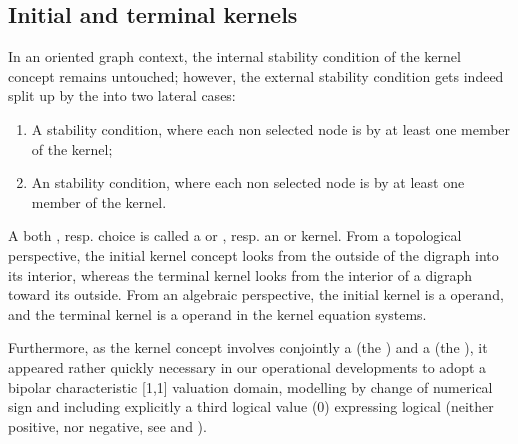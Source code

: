 \documentclass[a4paper,12pt,english]{sphinxhowto}
\begin{document}
\subsection{Initial and terminal kernels}
\label{\detokenize{tutorial:initial-and-terminal-kernels}}
In an oriented graph context, the internal stability condition of the kernel concept remains untouched; however, the external stability condition gets indeed split up by the  into two lateral cases:
\begin{enumerate}
%
\item {} 
A  stability condition, where each non selected node is  by at least one member of the kernel;

\item {} 
An  stability condition, where each non selected node is  by at least one member of the kernel.

\end{enumerate}

A both   , resp.  choice is called a  or , resp. an  or  kernel. From a topological perspective, the initial kernel concept looks from the outside of the digraph into its interior, whereas the terminal kernel looks from the interior of a digraph toward its outside. From an algebraic perspective, the initial kernel is a  operand, and the terminal kernel is a  operand in the  kernel equation systems.

Furthermore, as the kernel concept involves conjointly a  (the ) and a  (the ), it appeared rather quickly necessary in our operational developments to adopt a bipolar characteristic {[}\sphinxhyphen{}1,1{]} valuation domain, modelling  by change of numerical sign and including explicitly a third  logical value (0) expressing logical  (neither positive, nor negative, see  and ).
\end{document}
